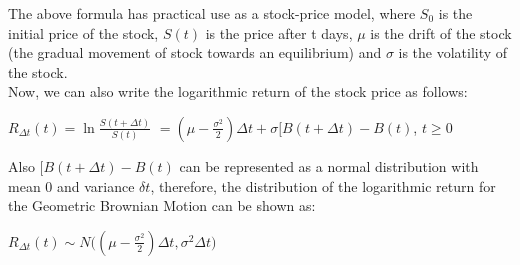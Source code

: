 \documentclass{article}
\begin{document}
    The above formula has practical use as a stock-price model, where $S_0$ is the initial price of the stock, $S(t)$ is the price after t days, $\mu$ is the drift of the stock (the gradual movement of stock towards an equilibrium) and $\sigma$ is the volatility of the stock.\\
    Now, we can also write the logarithmic return of the stock price as follows:\\
    \begin{center}
        $R_{\Delta t}(t) = \ln{\frac{S(t+\Delta t)}{S(t)}}$
        $= (\mu - \frac{\sigma^2}{2})\Delta t + \sigma[B(t + \Delta t) - B(t)$, $t \ge 0$
    \end{center}
    Also $[B(t + \Delta t) - B(t)$ can be represented as a normal distribution with mean 0 and variance $\delta t$, therefore, the distribution of the logarithmic return for the Geometric Brownian Motion can be shown as:\\
    \begin{center}
        $R_{\Delta t}(t) \sim N \bigg((\mu - \frac{\sigma^2}{2})\Delta t, \sigma^2\Delta t\bigg)$
    \end{center}
    
    
\end{document}
